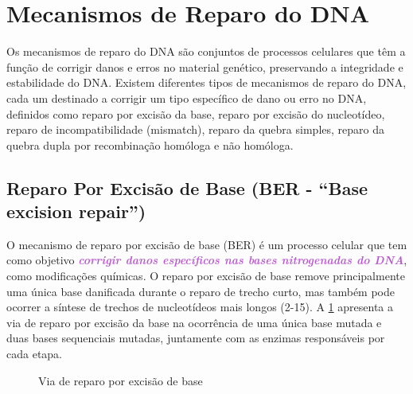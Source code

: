 \documentclass[11pt,a4paper]{article}
\begin{document}
\section{Mecanismos de Reparo do DNA}

	Os mecanismos de reparo do DNA são conjuntos de processos celulares que têm a função de corrigir danos e erros no material genético, preservando a integridade e estabilidade do DNA. Existem diferentes tipos de mecanismos de reparo do DNA, cada um destinado a corrigir um tipo específico de dano ou erro no DNA, definidos como reparo por excisão da base, reparo por excisão do nucleotídeo, reparo de incompatibilidade (mismatch), reparo da quebra simples, reparo da quebra dupla por recombinação homóloga e não homóloga. 

\subsection*{Reparo Por Excisão de Base (BER - ``Base excision repair'')}

	O mecanismo de reparo por excisão de base (BER) é um processo celular que tem como objetivo \textcolor{MediumOrchid}{\textbf{\textit{corrigir danos específicos nas bases nitrogenadas do DNA}}}, como modificações químicas. O reparo por excisão de base remove principalmente uma única base danificada durante o reparo de trecho curto, mas também pode ocorrer a síntese de trechos de nucleotídeos mais longos (2-15). A \ref{fig:excisaodeBase} apresenta a via de reparo por excisão da base na ocorrência de uma única base mutada e duas bases sequenciais mutadas, juntamente com as enzimas responsáveis por cada etapa.


	\begin{figure}[h]
		\centering
		\caption{Via de reparo por excisão de base}
		\label{fig:excisaodeBase}
	\end{figure}
\end{document}
